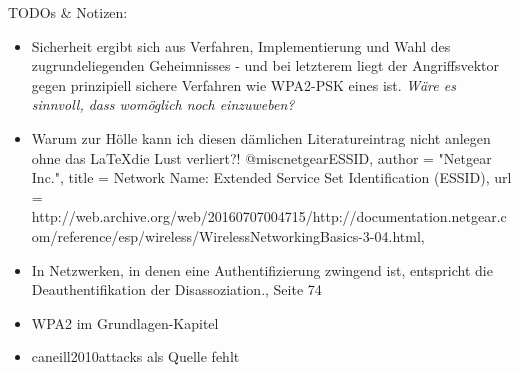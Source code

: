 TODOs \& Notizen:
\begin{itemize}
	\item Sicherheit ergibt sich aus Verfahren, Implementierung und Wahl des zugrundeliegenden Geheimnisses - und bei letzterem liegt der Angriffsvektor gegen prinzipiell sichere Verfahren wie WPA2-PSK eines ist. \textit{Wäre es sinnvoll, dass womöglich noch einzuweben?}
	\item Warum zur Hölle kann ich diesen dämlichen Literatureintrag nicht anlegen ohne das \LaTeX die Lust verliert?! @misc{netgearESSID,
		author = "Netgear Inc.",
		title = {Network Name: Extended Service Set Identification (ESSID)},
		url = {http://web.archive.org/web/20160707004715/http://documentation.netgear.com/reference/esp/wireless/WirelessNetworkingBasics-3-04.html},
	}
	\item In Netzwerken, in denen eine Authentifizierung zwingend ist, entspricht die Deauthentifikation der Disassoziation., Seite 74
	\item WPA2 im Grundlagen-Kapitel
	\item caneill2010attacks als Quelle fehlt
\end{itemize}